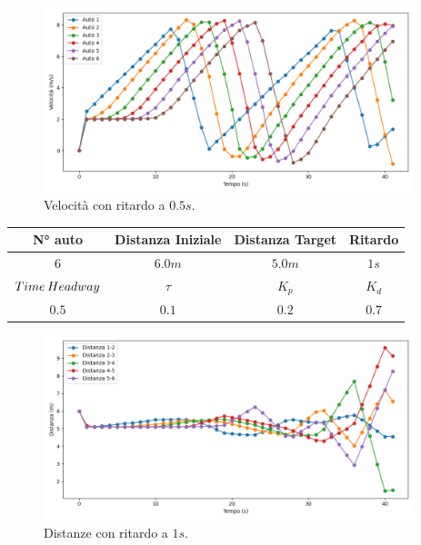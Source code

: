 \begin{figure}[H]
    \includegraphics[width=0.96\textwidth]{images/5-experiment/delay/velocity_0,5.png}
    \caption{Velocità con ritardo a $0.5 s$.}
    \label{fig:0.5-delay-velocity}
\end{figure}
\vspace*{\fill}
\newpage
\vspace*{\fill}
\begin{table}[h]
    \centering
    \begin{tabular}{|c|c|c|c|}
        \hline
        N° auto & Distanza Iniziale & Distanza Target & Ritardo \\
        \hline
        $6$ & $6.0 m$ & $5.0 m$ & $1 s$ \\
        \hline
        $Time\hspace{0.2em}Headway$ & $\tau$ & $K_p$ & $K_d$  \\
        \hline
        $0.5$ & $0.1$ & $0.2$ & $0.7$ \\
        \hline
    \end{tabular}
\end{table}

\begin{figure}[H]
    \includegraphics[width=0.96\textwidth]{images/5-experiment/delay/distance_1.png}
    \caption{Distanze con ritardo a $1 s$.}
    \label{fig:1-delay-distance}
\end{figure}

